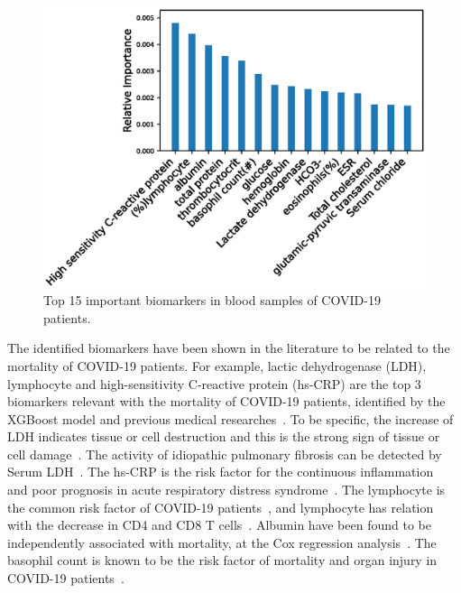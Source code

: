 \begin{figure}[h]
    \raggedright
    \includegraphics[width=1.0\linewidth]{figures/identified-features.eps}
    \caption{Top 15 important biomarkers in blood samples of COVID-19 patients.} \label{fig: identified-features COVID}
\end{figure}
The identified biomarkers have been shown in the literature to be related to the mortality of COVID-19 patients. For example, lactic dehydrogenase (LDH), lymphocyte and high-sensitivity C-reactive protein (hs-CRP) are the top 3 biomarkers relevant with the mortality of COVID-19 patients, identified by the XGBoost model \cite{yan2020interpretable} and previous medical researches~\cite{kishaba2014staging,ridker2008rosuvastatin,wang2020clinical}. %
To be specific, the increase of LDH indicates tissue or cell destruction and this is the strong sign of tissue or cell damage~\cite{yan2020interpretable}. The activity of idiopathic pulmonary fibrosis can be detected by Serum LDH~\cite{kishaba2014staging}. The hs-CRP is the risk factor for the continuous inflammation~\cite{bajwa2009plasma} and poor prognosis in acute respiratory distress syndrome~\cite{kishaba2014staging,sharma2016aetiology}. The lymphocyte is the common risk factor of COVID-19 patients~\cite{chan2020familial}, and lymphocyte has relation with the decrease in CD4 and CD8 T cells~\cite{liu2020longitudinal}.
Albumin have been found to be independently associated with mortality, at the Cox regression analysis~\cite{violi2020albumin}. The basophil count is known to be the risk factor of mortality and organ injury in COVID-19 patients~\cite{li2020immune}. 

